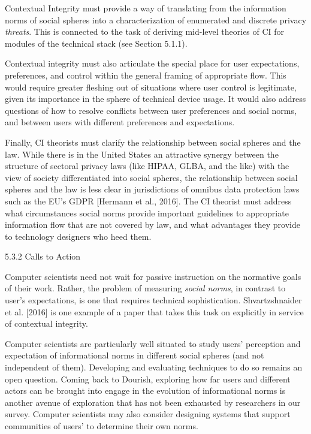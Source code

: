 \documentclass[../thesis.tex]{subfiles}
\begin{document}
\bigskip

Contextual Integrity must provide a way of translating from the
information norms of social spheres into a characterization of
enumerated and discrete privacy \textit{threats}. This is connected to
the task of deriving mid-level theories of CI for modules of the
technical stack (see Section 5.1.1).


\bigskip

Contextual integrity must also articulate the special place for user
expectations, preferences, and control within the general framing of
appropriate flow. This would require greater fleshing out of situations
where user control is legitimate, given its importance in the sphere of
technical device usage. It would also address questions of how to
resolve conflicts between user preferences and social norms, and
between users with different preferences and expectations.


\bigskip

Finally, CI theorists must clarify the relationship between social
spheres and the law. While there is in the United States an attractive
synergy between the structure of sectoral privacy laws (like HIPAA,
GLBA, and the like) with the view of society differentiated into social
spheres, the relationship between social spheres and the law is less
clear in jurisdictions of omnibus data protection laws such as the
EU's GDPR [Hermann et al., 2016]. The CI theorist must
address what circumstances social norms provide important guidelines to
appropriate information flow that are not covered by law, and what
advantages they provide to technology designers who heed them.

{\color[rgb]{0.2627451,0.2627451,0.2627451}
5.3.2 Calls to Action}

Computer scientists need not wait for passive instruction on the
normative goals of their work. Rather, the problem of measuring
\textit{social norms}, in contrast to user's
expectations, is one that requires technical sophistication.
Shvartzshnaider et al. [2016] is one example of a paper that takes this
task on explicitly in service of contextual integrity.


\bigskip

Computer scientists are particularly well situated to study
users' perception and expectation of informational
norms in different social spheres (and not independent of them).
Developing and evaluating techniques to do so remains an open question.
Coming back to Dourish, exploring how far users and different actors
can be brought into engage in the evolution of informational norms is
another avenue of exploration that has not been exhausted by
researchers in our survey. Computer scientists may also consider
designing systems that support communities of users' to
determine their own norms.
\end{document}
